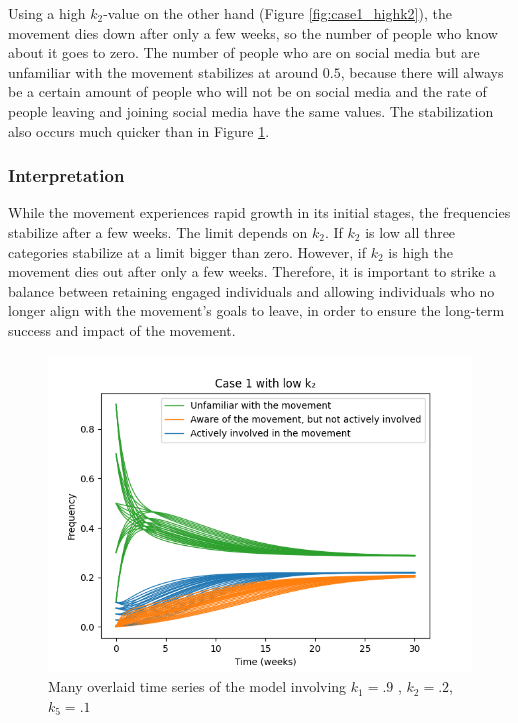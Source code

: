 \documentclass{article}
\begin{document}
    Using a high $k_2$-value on the other hand (Figure \ref{fig:case1_highk2}), the movement dies down after only a few weeks, so the number of people who know about it goes to zero. The number of people who are on social media but are unfamiliar with the movement stabilizes at around $0.5$, because there will always be a certain amount of people who will not be on social media and the rate of people leaving and joining social media have the same values. The stabilization also occurs much quicker than in Figure \ref{fig:case1_lowk2}. 
    
    \subsubsection*{Interpretation}  While the movement experiences rapid growth in its initial stages, the frequencies stabilize after a few weeks. The limit depends on $k_2$. If $k_2$ is low all three categories stabilize at a limit bigger than zero. However, if $k_2$ is high the movement dies out after only a few weeks. Therefore, it is important to strike a balance between retaining engaged individuals and allowing individuals who no longer align with the movement's goals to leave, in order to ensure the long-term success and impact of the movement.
    
    \begin{figure}[H]

        \centering
        \includegraphics[width=\textwidth]{simulation/plots/case1-lowk2.png}   
        \caption{Many overlaid time series of the model involving \mbox{$k_1=.9$} , \mbox{$k_2=.2$}, \mbox{$k_5=.1$}}
        \label{fig:case1_lowk2}
    \end{figure}
\end{document}

